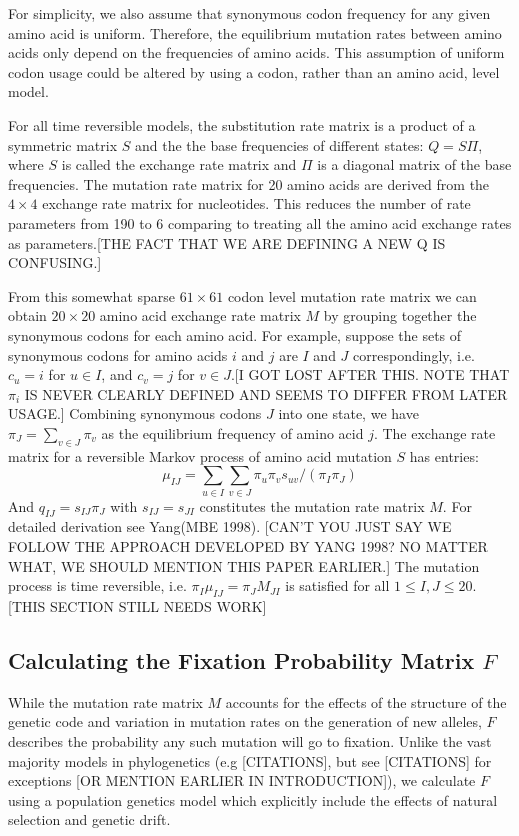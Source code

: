 \documentclass[13pt]{article}
\begin{document}
For simplicity, we also assume that synonymous codon frequency for any given amino acid is uniform.
Therefore, the equilibrium mutation rates between amino acids only depend on the frequencies of amino acids.
This assumption of uniform codon usage could be altered by using a codon, rather than an amino acid, level model.


For all time reversible models, the substitution rate matrix is a product of a symmetric matrix $S$ and the the base frequencies of different states: $Q = S\Pi$, where $S$ is called the exchange rate matrix and $\Pi$ is a diagonal matrix of the base frequencies.
The mutation rate matrix for 20 amino acids are derived from the $4 \times 4 $ exchange rate matrix for nucleotides.
This reduces the number of rate parameters from 190 to 6 comparing to treating all the amino acid exchange rates as parameters.[THE FACT THAT WE ARE DEFINING A NEW Q IS CONFUSING.]

From this somewhat sparse $61 \times 61$ codon level mutation rate matrix we can obtain $20 \times 20$ amino acid exchange rate matrix $M$ by grouping together the synonymous codons for each amino acid.
For example, suppose the sets of synonymous codons for amino acids $i$ and $j$ are $I$ and $J$ correspondingly, i.e. $c_u = i$ for $u \in I$, and $c_v = j$ for $v \in J$.[I GOT LOST AFTER THIS. NOTE THAT $\pi_i$ IS NEVER CLEARLY DEFINED AND SEEMS TO DIFFER FROM LATER USAGE.]
Combining synonymous codons $J$ into one state, we have $\pi_J = \sum_{v \in J} \pi_v$ as the equilibrium frequency of amino acid $j$.
The exchange rate matrix for a reversible Markov process of amino acid mutation $S$ has entries:
\[\mu_{IJ} = \sum_{u \in I} \sum_{v \in J} \pi_u \pi_v s_{uv} / (\pi_I \pi_J)\]
\noindent
And $q_{IJ} = s_{IJ} \pi_J$ with $s_{IJ}  = s_{JI}$ constitutes the mutation rate matrix $M$.
For detailed derivation see Yang(MBE 1998). [CAN'T YOU JUST SAY WE FOLLOW THE APPROACH DEVELOPED BY YANG 1998?  NO MATTER WHAT, WE SHOULD MENTION THIS PAPER EARLIER.]
The mutation process is time reversible, i.e. $\pi_I \mu_{IJ} = \pi_J M_{JI}$ is satisfied for all $1 \leq I,J \leq 20$.
[THIS SECTION STILL NEEDS WORK]

\subsection*{Calculating the Fixation Probability Matrix $F$}
While the mutation rate matrix $M$ accounts for the effects of the structure of the genetic code and variation in mutation rates on the generation of new alleles,  $F$ describes the probability any such mutation will go to fixation.
Unlike the vast majority models in phylogenetics (e.g [CITATIONS], but see [CITATIONS] for exceptions [OR MENTION EARLIER IN INTRODUCTION]), we calculate $F$ using a population genetics model which explicitly include the effects of natural selection and genetic drift. 
\end{document}

